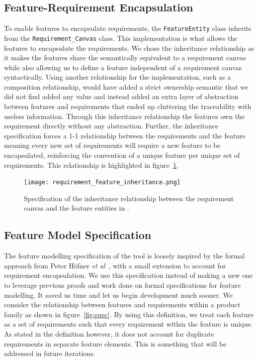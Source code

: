 \subsection{Feature-Requirement Encapsulation}
To enable features to encapsulate requirements, the \texttt{FeatureEntity} class inherits from the \texttt{Requirement\_Canvas} class. This implementation is what allows the features to encapsulate the requirements. We chose the inheritance relationship as it makes the features share the semantically equivalent to a requirement canvas while also allowing us to define a feature independent of a requirement canvas syntactically. Using another relationship for the implementation, such as a composition relationship, would have added a strict ownership semantic that we did not find added any value and instead added an extra layer of abstraction between features and requirements that ended up cluttering the traceability with useless information. Through this inheritance relationship the features own the requirement directly without any abstraction. Further, the inheritance specification forces a 1-1 relationship between the requirements and the feature meaning every new set of requirements will require a new feature to be encapsulated, reinforcing the convention of a unique feature per unique set of requirements. This relationship is highlighted in figure~\ref{fig:requirement_feature_inheritance}.

\begin{figure}
	\centering
	\texttt{[image: requirement\_feature\_inheritance.png]}
	\caption{Specification of the inheritance relationship between the requirement canvas and the feature entities in \tool.}
	\label{fig:requirement_feature_inheritance}
\end{figure}

\subsection{Feature Model Specification}

The feature modelling specification of the tool is loosely inspired by the formal approach from Peter H\"{o}fner \textit{et al}~\cite{hofner2006feature,hofner2011algebra}, with a small extension to account for requirement encapsulation. We use this specification instead of making a new one to leverage previous proofs and work done on formal specifications for feature modelling. It saved us time and let us begin development much sooner. We consider the relationship between features and requirements within a product family as shown in figure~\ref{fig:spec}. By using this definition, we treat each feature as a set of requirements such that every requirement within the feature is unique. As stated in the definition however, it does not account for duplicate requirements in separate feature elements. This is something that will be addressed in future iterations. 


